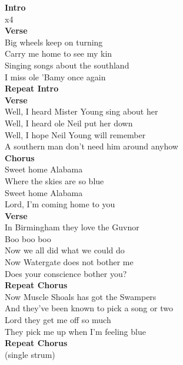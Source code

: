 \textbf{Intro}  \\
x4\\
\textbf{Verse}\\
 Big wheels keep on turning\\
 Carry me home to see my  kin\\
 Singing songs about the southland\\
 I miss ole 'Bamy once again \\
\textbf{Repeat Intro}\\
\textbf{Verse}\\
 Well, I heard Mister Young sing about her\\
 Well, I heard ole Neil put her down\\
 Well, I hope Neil Young will remember\\
 A southern man don't need him around anyhow\\
\textbf{Chorus} \\
  Sweet home Alabama \\
 Where the skies are so blue\\
  Sweet home Alabama\\
  Lord, I'm coming home to you\\
\textbf{Verse}\\
 In Birmingham they love the Guvnor\\
 Boo  boo  boo\\
 Now we all did what we could do\\
 Now Watergate does not bother me\\
 Does your conscience bother you?  \\
\textbf{Repeat Chorus} \\
 Now Muscle Shoals has got the Swampers\\
 And they've been known to pick a song or two \\
 Lord they get me off so much\\
  They pick me up when I'm feeling blue \\
\textbf{Repeat Chorus} \\
  (single strum)\\
